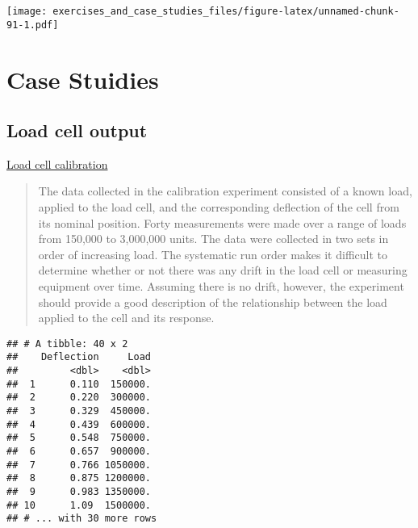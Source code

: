 \documentclass[]{book}
\newenvironment{Shaded}{\begin{snugshade}}{\end{snugshade}}
\newcommand{\DataTypeTok}[1]{\textcolor[rgb]{0.13,0.29,0.53}{#1}}
\newcommand{\DecValTok}[1]{\textcolor[rgb]{0.00,0.00,0.81}{#1}}
\newcommand{\KeywordTok}[1]{\textcolor[rgb]{0.13,0.29,0.53}{\textbf{#1}}}
\newcommand{\NormalTok}[1]{#1}
\newcommand{\OperatorTok}[1]{\textcolor[rgb]{0.81,0.36,0.00}{\textbf{#1}}}
\newcommand{\OtherTok}[1]{\textcolor[rgb]{0.56,0.35,0.01}{#1}}
\newcommand{\StringTok}[1]{\textcolor[rgb]{0.31,0.60,0.02}{#1}}
\theoremstyle{definition}
\theoremstyle{definition}
\theoremstyle{definition}
\theoremstyle{remark}
\begin{document}
\texttt{[image: exercises\_and\_case\_studies\_files/figure-latex/unnamed-chunk-91-1.pdf]}

\hypertarget{case-stuidies}{%
\section{Case Stuidies}\label{case-stuidies}}

\hypertarget{load-cell-output}{%
\subsection{Load cell output}\label{load-cell-output}}

\href{https://www.itl.nist.gov/div898/handbook/pmd/section6/pmd61.htm}{Load
cell calibration}

\begin{quote}
The data collected in the calibration experiment consisted of a known
load, applied to the load cell, and the corresponding deflection of the
cell from its nominal position. Forty measurements were made over a
range of loads from 150,000 to 3,000,000 units. The data were collected
in two sets in order of increasing load. The systematic run order makes
it difficult to determine whether or not there was any drift in the load
cell or measuring equipment over time. Assuming there is no drift,
however, the experiment should provide a good description of the
relationship between the load applied to the cell and its response.
\end{quote}

\begin{Shaded}
\end{Shaded}

\begin{verbatim}
## # A tibble: 40 x 2
##    Deflection     Load
##         <dbl>    <dbl>
##  1      0.110  150000.
##  2      0.220  300000.
##  3      0.329  450000.
##  4      0.439  600000.
##  5      0.548  750000.
##  6      0.657  900000.
##  7      0.766 1050000.
##  8      0.875 1200000.
##  9      0.983 1350000.
## 10      1.09  1500000.
## # ... with 30 more rows
\end{verbatim}
\end{document}
